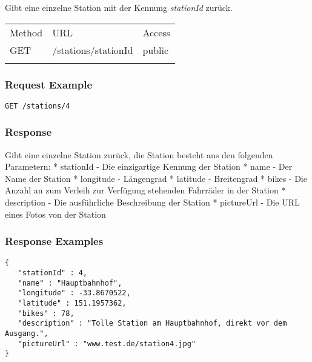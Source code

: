Gibt eine einzelne Station mit der Kennung \emph{stationId} zurück.

\begin{longtable}[c]{@{}lll@{}}
\toprule\addlinespace
Method & URL & Access
\\\addlinespace
\midrule\endhead
GET & /stations/stationId & public
\\\addlinespace
\bottomrule
\end{longtable}

\subsubsection{Request Example}\label{request-example}

\begin{verbatim}
GET /stations/4
\end{verbatim}

\subsubsection{Response}\label{response}

Gibt eine einzelne Station zurück, die Station besteht aus den folgenden
Parametern: * stationId - Die einzigartige Kennung der Station * name -
Der Name der Station * longitude - Längengrad * latitude - Breitengrad *
bikes - Die Anzahl an zum Verleih zur Verfügung stehenden Fahrräder in
der Station * description - Die ausführliche Beschreibung der Station *
pictureUrl - Die URL eines Fotos von der Station

\subsubsection{Response Examples}\label{response-examples}

\begin{verbatim}
{
   "stationId" : 4,
   "name" : "Hauptbahnhof",
   "longitude" : -33.8670522,
   "latitude" : 151.1957362,
   "bikes" : 78,
   "description" : "Tolle Station am Hauptbahnhof, direkt vor dem Ausgang.",
   "pictureUrl" : "www.test.de/station4.jpg"
}
\end{verbatim}
